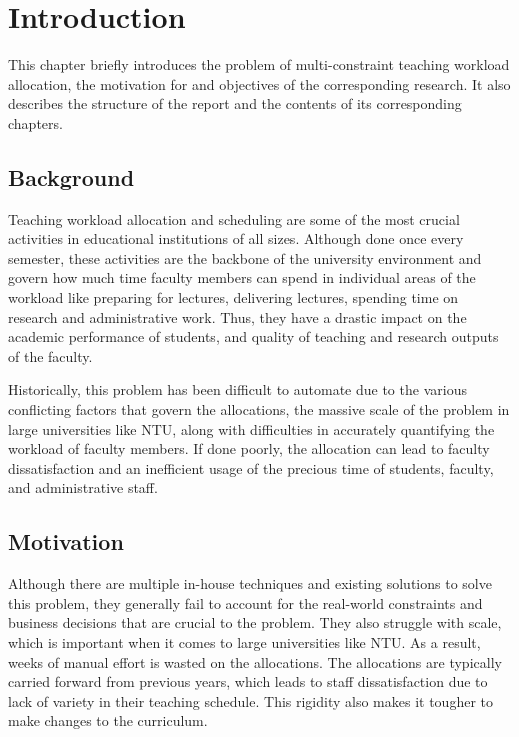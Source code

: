 \chapter{Introduction}

This chapter briefly introduces the problem of multi-constraint teaching workload allocation, the motivation for and objectives of the corresponding research. It also describes the structure of the report and the contents of its corresponding chapters.

\section{Background}

Teaching workload allocation and scheduling are some of the most crucial activities in educational institutions of all sizes. Although done once every semester, these activities are the backbone of the university environment and govern how much time faculty members can spend in individual areas of the workload like preparing for lectures, delivering lectures, spending time on research and administrative work. Thus, they have a drastic impact on the academic performance of students, and quality of teaching and research outputs of the faculty.

Historically, this problem has been difficult to automate due to the various conflicting factors that govern the allocations, the massive scale of the problem in large universities like NTU, along with difficulties in accurately quantifying the workload of faculty members. If done poorly, the allocation can lead to faculty dissatisfaction and an inefficient usage of the precious time of students, faculty, and administrative staff.

\section{Motivation}

Although there are multiple in-house techniques and existing solutions to solve this problem, they generally fail to account for the real-world constraints and business decisions that are crucial to the problem. They also struggle with scale, which is important when it comes to large universities like NTU. As a result, weeks of manual effort is wasted on the allocations. The allocations are typically carried forward from previous years, which leads to staff dissatisfaction due to lack of variety in their teaching schedule. This rigidity also makes it tougher to make changes to the curriculum.

